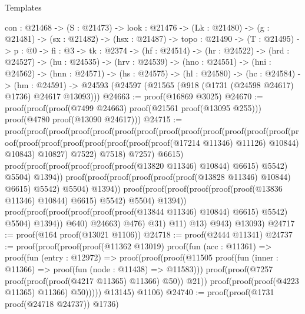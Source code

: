 \begin{lexlean}{Templates}
\begin{coremodule}
  {con : @21468} ->
  (S : @21473) ->
  {look : @21476} ->
  (Lk : @21480) ->
  (g : @21481) ->
  (sx : @21482) ->
  (hsx : @21487) ->
  {topo : @21490} ->
  (T : @21495) ->
  {p : @0} ->
  {fi : @3} ->
  {tk : @2374} ->
  (hf : @24514) ->
  (hr : @24522) ->
  (hrd : @24527) ->
  (hu : @24535) ->
  (hrv : @24539) ->
  (hno : @24551) ->
  (hni : @24562) ->
  (hnn : @24571) ->
  (hs : @24575) ->
  (hl : @24580) ->
  (hc : @24584) ->
  (hm : @24591) -> @24593 (@24597 (@21565 (@918 (@1731 (@24598 @24617) @1736) @24617 @13093)))
@24663 := proof(@16869 @3025)
@24670 := proof(proof(proof(@7499 @24663) proof(@21561 proof(@13095 @255)))
      proof(@4780 proof(@13090 @24617)))
@24715 := proof(proof(proof(proof(proof(proof(proof(proof(proof(proof(proof(proof(proof(proof(proof(proof(proof(proof(proof(proof(proof(@17214
                                              @11346)
                                            @11126)
                                          @10844)
                                        @10843)
                                      @10827)
                                    @7522)
                                  @7518)
                                @7257)
                              @6615)
                            proof(proof(proof(proof(proof(proof(@13820 @11346) @10844) @6615) @5542)
                                  @5504)
                                @1394))
                          proof(proof(proof(proof(proof(proof(@13828 @11346) @10844) @6615) @5542)
                                @5504)
                              @1394))
                        proof(proof(proof(proof(proof(proof(@13836 @11346) @10844) @6615) @5542)
                              @5504)
                            @1394))
                      proof(proof(proof(proof(proof(proof(@13844 @11346) @10844) @6615) @5542)
                            @5504)
                          @1394))
                    @640)
                  @24663)
                @476)
              @31)
            @11)
          @13)
        @943)
      @13093)
@24717 := proof(@164 proof(@13021 @1106))
@24718 := proof(@2444 @11341)
@24737 := proof(proof(proof(proof(@11362 @13019)
          proof(fun (acc : @11361) =>
            proof(fun (entry : @12972) =>
              proof(proof(proof(@11505
                      proof(fun (inner : @11366) => proof(fun (node : @11438) => @11583)))
                    proof(proof(@7257 proof(proof(proof(@4217 @11365) @11366) @50)) @21))
                  proof(proof(proof(@4223 @11365) @11366) @50)))))
        @13145)
      @1106)
@24740 := proof(proof(@1731 proof(@24718 @24737)) @1736)

\end{coremodule}
\end{lexlean}
